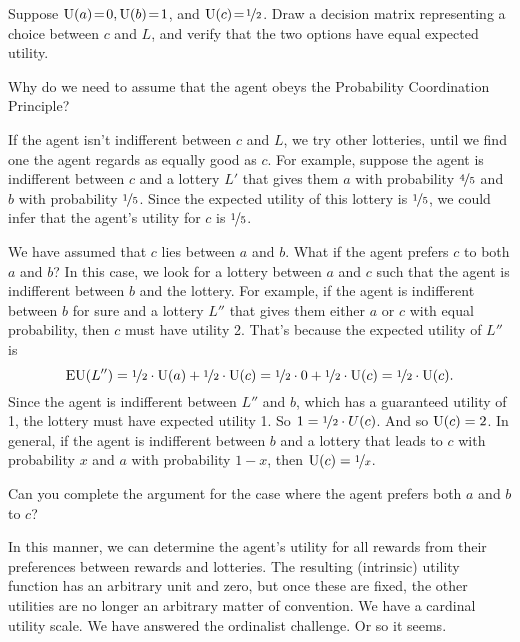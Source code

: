 \begin{exercise}{1}
  Suppose $\text{U}(a)\!=\!0, \text{U}(b)\!=\!1$, and $\text{U}(c) \!=\! \nicefrac{1}{2}$. Draw a
  decision matrix representing a choice between $c$ and $L$, and verify that
  the two options have equal expected utility.
\end{exercise}

\begin{exercise}{2}
  Why do we need to assume that the agent obeys the Probability Coordination
  Principle?
\end{exercise}

If the agent isn't indifferent between $c$ and $L$, we try other lotteries,
until we find one the agent regards as equally good as $c$. For example, suppose
the agent is indifferent between $c$ and a lottery $L'$ that gives them $a$
with probability $\nicefrac{4}{5}$ and $b$ with probability $\nicefrac{1}{5}$.
Since the expected utility of this lottery is $\nicefrac{1}{5}$, we could infer
that the agent's utility for $c$ is $\nicefrac{1}{5}$.

We have assumed that $c$ lies between $a$ and $b$. What if the agent prefers $c$
to both $a$ and $b$? In this case, we look for a lottery between $a$ and $c$
such that the agent is indifferent between $b$ and the lottery. For example, if
the agent is indifferent between $b$ for sure and a lottery $L''$ that gives
them either $a$ or $c$ with equal probability, then $c$ must have utility 2.
That's because the expected utility of $L''$ is
\[
  \text{EU}(L'') = \nicefrac{1}{2} \cdot \text{U}(a) + \nicefrac{1}{2} \cdot \text{U}(c) =  
   \nicefrac{1}{2} \cdot 0 + \nicefrac{1}{2} \cdot \text{U}(c) = \nicefrac{1}{2} \cdot \text{U}(c). 
\]
Since the agent is indifferent between $L''$ and $b$, which has a
guaranteed utility of 1, the lottery must have expected utility 1. So
$1 = \nicefrac{1}{2} \cdot U(c)$. And so $\text{U}(c) = 2$. In general, if
the agent is indifferent between $b$ and a lottery that leads to $c$
with probability $x$ and $a$ with probability $1-x$, then
$\text{U}(c) = \nicefrac{1}{x}$.


\begin{exercise}{2}
  Can you complete the argument for the case where the agent prefers
  both $a$ and $b$ to $c$?
\end{exercise}

In this manner, we can determine the agent's utility for all rewards from their
preferences between rewards and lotteries. The resulting (intrinsic) utility
function has an arbitrary unit and zero, but once these are fixed, the other
utilities are no longer an arbitrary matter of convention. We have a cardinal
utility scale. We have answered the ordinalist challenge. Or so it seems.

